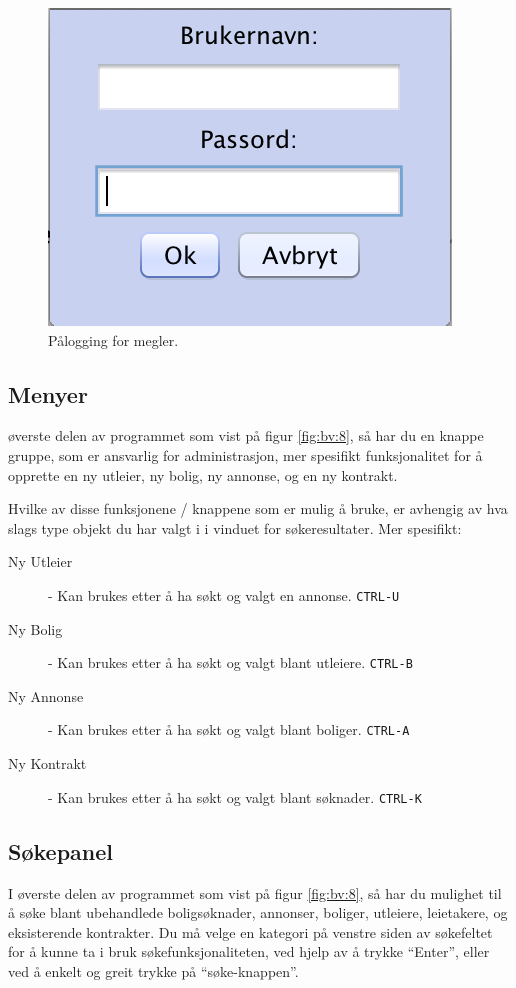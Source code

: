 \begin{figure}[h!]
\center
 \includegraphics[scale=0.7]{./img/brukerveiledning/7.png}
 \caption{Pålogging for megler.}
 \label{fig:bv:7}
\end{figure}





\subsection{Menyer}
øverste delen av programmet som vist på figur \ref{fig:bv:8}, så har du en knappe gruppe, som er ansvarlig
for administrasjon, mer spesifikt funksjonalitet for å opprette en ny utleier, ny bolig, ny annonse, og
en ny kontrakt.

Hvilke av disse funksjonene / knappene som er mulig å bruke, er avhengig av hva slags type
objekt du har valgt i i vinduet for søkeresultater. Mer spesifikt:

\begin{description}
\item[Ny Utleier] -
Kan brukes etter å ha søkt og valgt en annonse. \texttt{CTRL-U}
\item[Ny Bolig] -
Kan brukes etter å ha søkt og valgt blant utleiere. \texttt{CTRL-B}
\item[Ny Annonse] -
Kan brukes etter å ha søkt og valgt blant boliger. \texttt{CTRL-A}
\item[Ny Kontrakt] -
Kan brukes etter å ha søkt og valgt blant søknader. \texttt{CTRL-K}
\end{description}




\newpage
\subsection{Søkepanel}
I øverste delen av programmet som vist på figur \ref{fig:bv:8}, så har du mulighet til å søke blant
ubehandlede boligsøknader, annonser, boliger, utleiere, leietakere, og eksisterende kontrakter.
Du må velge en kategori på venstre siden av søkefeltet for å kunne ta i bruk søkefunksjonaliteten,
ved hjelp av å trykke “Enter”, eller ved å enkelt og greit trykke på “søke-knappen”.


